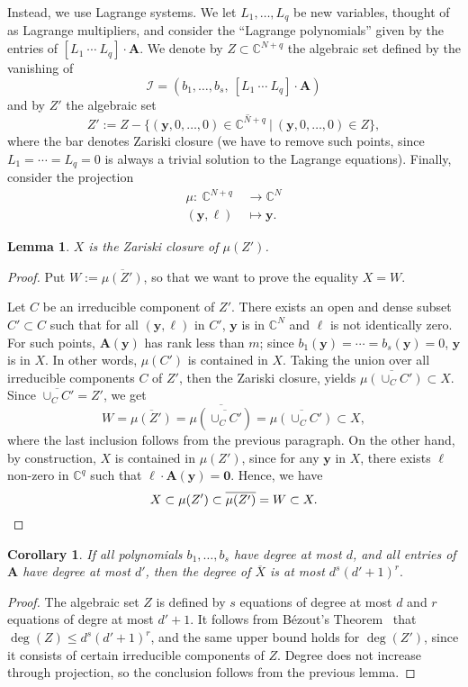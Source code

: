 \documentclass[12pt]{article}
\def\yb{{\bm y}}
\def\C{\mathbb{C}}
\newtheorem{corollary}[theorem]{Corollary}
\newtheorem{lemma}[theorem]{Lemma}
\begin{document}
Instead, we use Lagrange systems. We let $L_1,\hdots,L_q$ be new
variables, thought of as Lagrange multipliers, and consider the
``Lagrange polynomials'' given by the entries of $ [ L_1 ~\cdots~
  L_q]\cdot \bm A$. We denote by $Z \subset \C^{N+q}$ the algebraic set
defined by the vanishing of
\[\mathscr{I} = ( b_1,\dots,b_s, \  [ L_1 ~\cdots~ L_q]\cdot \bm A )\]
and by $Z'$ the algebraic set
\[
Z' := \overline{Z - \{(\yb,0,\dots,0) \in \C^{N+q}~|~(\yb,0,\dots,0) \in Z\}},
\]
where the bar denotes Zariski closure (we have to remove such points,
since $L_1=\cdots=L_q=0$ is always a trivial solution to the Lagrange
equations). Finally, consider the projection
\begin{align*} 
  \mu :~ \C^{N+q} &\rightarrow \C^{N}\\
  (\yb,\bm \ell)~ &\mapsto \yb.
\end{align*}
\begin{lemma}\label{lemma:Z_W}
  $X$ is the Zariski closure of ${\mu(Z')}$.
\end{lemma}
\begin{proof}
  Put $W := \overline{\mu(Z')}$, so that we want to prove the equality $X=W$.

  Let $C$ be an irreducible component of $Z'.$ There exists an open
  and dense subset $C' \subset C$ such that for all $(\yb,\bm \ell)$
  in $C'$, $\yb$ is in $\C^N$ and $\bm\ell$ is not identically
  zero. For such points, $\bm A(\yb)$ has rank less than $m$; since
  $b_1(\yb)=\cdots=b_s(\yb)=0$, $\yb$ is in $X$. In other words,
  $\mu(C')$ is contained in $X$.  Taking the union over all
  irreducible components $C$ of $Z'$, then the Zariski closure, yields
  $ \overline{\mu(\cup_{C} C')} \subset {X}$.
  Since $\overline{\cup_{C} C'} = Z'$,
  we get 
  \[
  W = \overline{\mu(Z')} = \overline{\mu(\overline{\cup_{C} C'})}
  = \overline{\mu(\cup_{C} C')} \subset {X},
  \]
  where the last inclusion follows from the previous paragraph. On the
  other hand, by construction, $X$ is contained in $\mu(Z')$, since
  for any $\yb$ in $X$, there exists $\bm \ell$ non-zero in $\C^q$
  such that $ \bm \ell \cdot \bm A(\yb) = \bm 0.$ Hence, we have
  \[
  X\subset\mu(Z')\subset \overline{\mu(Z')} = W \subset{X}.\qedhere
  \]
\end{proof}

\begin{corollary} \label{coro:degree}
  If all polynomials $b_1,\dots,b_s$ have degree at most $d$, and all
  entries of $\bm A$ have degree at most $d'$, then the degree of
  $\overline{X}$ is at most $d^s (d'+1)^r.$
\end{corollary}
\begin{proof}
  The algebraic set $Z$ is defined by $s$ equations of degree at most
  $d$ and $r$ equations of degre at most $d'+1$. It follows from
  B\'ezout's Theorem~\cite{H} that $\deg(Z) \leq d^s (d'+1)^r$, and
  the same upper bound holds for $\deg(Z')$, since it consists of
  certain irreducible components of $Z$. Degree does not increase
  through projection, so the conclusion follows from the previous
  lemma.
\end{proof}
\end{document}
